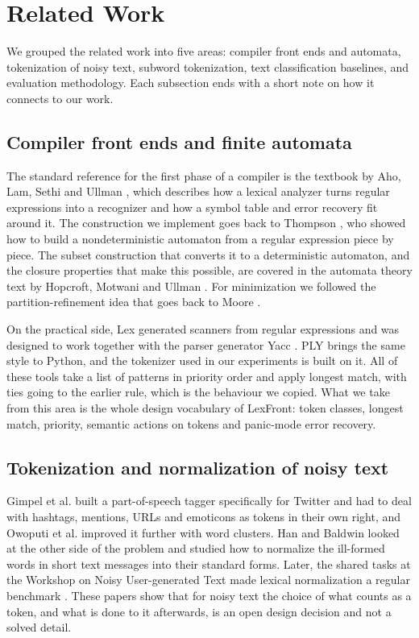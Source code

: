 \documentclass{ieeeaccess}
\begin{document}
\section{Related Work}\label{sec:2}
We grouped the related work into five areas: compiler front ends and automata, tokenization of noisy text, subword tokenization, text classification baselines, and evaluation methodology. Each subsection ends with a short note on how it connects to our work.

\subsection{Compiler front ends and finite automata}\label{sec:2.1}
The standard reference for the first phase of a compiler is the textbook by Aho, Lam, Sethi and Ullman \cite{r1}, which describes how a lexical analyzer turns regular expressions into a recognizer and how a symbol table and error recovery fit around it. The construction we implement goes back to Thompson \cite{r5}, who showed how to build a nondeterministic automaton from a regular expression piece by piece. The subset construction that converts it to a deterministic automaton, and the closure properties that make this possible, are covered in the automata theory text by Hopcroft, Motwani and Ullman \cite{r6}. For minimization we followed the partition-refinement idea that goes back to Moore \cite{r7}.

On the practical side, Lex \cite{r8} generated scanners from regular expressions and was designed to work together with the parser generator Yacc \cite{r9}. PLY \cite{r10} brings the same style to Python, and the tokenizer used in our experiments is built on it. All of these tools take a list of patterns in priority order and apply longest match, with ties going to the earlier rule, which is the behaviour we copied. What we take from this area is the whole design vocabulary of LexFront: token classes, longest match, priority, semantic actions on tokens and panic-mode error recovery.

\subsection{Tokenization and normalization of noisy text}\label{sec:2.2}
Gimpel et al. \cite{r2} built a part-of-speech tagger specifically for Twitter and had to deal with hashtags, mentions, URLs and emoticons as tokens in their own right, and Owoputi et al. \cite{r11} improved it further with word clusters. Han and Baldwin \cite{r3} looked at the other side of the problem and studied how to normalize the ill-formed words in short text messages into their standard forms. Later, the shared tasks at the Workshop on Noisy User-generated Text made lexical normalization a regular benchmark \cite{r12}. These papers show that for noisy text the choice of what counts as a token, and what is done to it afterwards, is an open design decision and not a solved detail.
\end{document}
